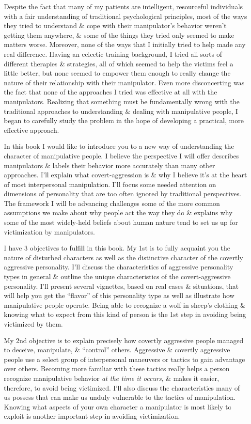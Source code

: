 \documentclass{article}
\numberwithin{equation}{section}
\begin{document}
Despite the fact that many of my patients are intelligent, resourceful individuals with a fair understanding of traditional psychological principles, most of the ways they tried to understand \& cope with their manipulator's behavior weren't getting them anywhere, \& some of the things they tried only seemed to make matters worse. Moreover, none of the ways that I initially tried to help made any real difference. Having an eclectic training background, I tried all sorts of different therapies \& strategies, all of which seemed to help the victims feel a little better, but none seemed to empower them enough to really change the nature of their relationship with their manipulator. Even more disconcerting was the fact that none of the approaches I tried was effective at all with the manipulators. Realizing that something must be fundamentally wrong with the traditional approaches to understanding \& dealing with manipulative people, I began to carefully study the problem in the hope of developing a practical, more effective approach.

In this book I would like to introduce you to a new way of understanding the character of manipulative people. I believe the perspective I will offer describes manipulators \& labels their behavior more accurately than many other approaches. I'll explain what covert-aggression is \& why I believe it's at the heart of most interpersonal manipulation. I'll focus some needed attention on dimensions of personality that are too often ignored by traditional perspectives. The framework I will be advancing challenges some of the more common assumptions we make about why people act the way they do \& explains why some of the most widely-held beliefs about human nature tend to set us up for victimization by manipulators.

I have 3 objectives to fulfill in this book. My 1st is to fully acquaint you the nature of disturbed characters as well as the distinctive character of the covertly aggressive personality. I'll discuss the characteristics of aggressive personality types in general \& outline the unique characteristics of the covert-aggressive personality. I'll present several vignettes, based on real cases \& situations, that will help you get the ``flavor'' of this personality type as well as illustrate how manipulative people operate. Being able to recognize a wolf in sheep's clothing \& knowing what to expect from this kind of person is the 1st step in avoiding being victimized by them.

My 2nd objective is to explain precisely how covertly aggressive people managed to deceive, manipulate, \& ``control'' others. Aggressive \& covertly aggressive people use a select group of interpersonal maneuvers or tactics to gain advantage over others. Becoming more familiar with these tactics really helps a person recognize manipulative behavior \textit{at the time it occurs}, \& makes it easier, therefore, to avoid being victimized. I'll also discuss the characteristics many of us possess that can make us unduly vulnerable to the tactics of manipulation. Knowing what aspects of your own character a manipulator is most likely to exploit is another important step in avoiding victimization.
\end{document}
